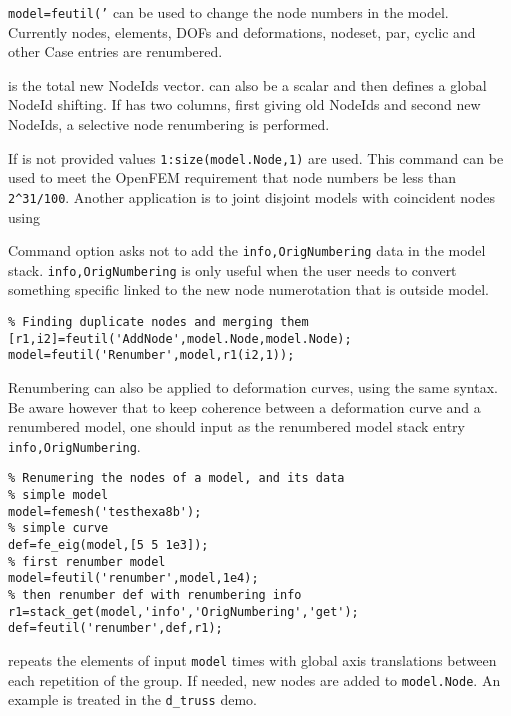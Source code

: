 
{\tt model=feutil('} can be used to change the node numbers in the model. Currently nodes, elements, DOFs and deformations, nodeset, par, cyclic and other Case entries are renumbered.

 is the total new NodeIds vector.  can also be a scalar and then defines a global NodeId shifting. If  has two columns, first giving old NodeIds and second new NodeIds, a selective node renumbering is performed.

If  is not provided values {\tt 1:size(model.Node,1)} are used.  This command can be used to meet the OpenFEM requirement that node numbers be less than {\tt 2\verb+^+31/100}. Another application is to joint disjoint models with coincident nodes using

Command option  asks not to add the {\tt info,OrigNumbering} data in the model stack. {\tt info,OrigNumbering} is only useful when the user needs to convert something specific linked to the new node numerotation that is outside model.

\begin{verbatim}
% Finding duplicate nodes and merging them
[r1,i2]=feutil('AddNode',model.Node,model.Node);
model=feutil('Renumber',model,r1(i2,1));
\end{verbatim}

Renumbering can also be applied to deformation curves, using the same syntax. Be aware however that to keep coherence between a deformation curve and a renumbered model, one should input  as the renumbered model stack entry {\tt info,OrigNumbering}.

\begin{verbatim}
% Renumering the nodes of a model, and its data
% simple model
model=femesh('testhexa8b');
% simple curve
def=fe_eig(model,[5 5 1e3]);
% first renumber model
model=feutil('renumber',model,1e4);
% then renumber def with renumbering info
r1=stack_get(model,'info','OrigNumbering','get');
def=feutil('renumber',def,r1);
\end{verbatim}%


  repeats the elements of input {\tt model}  times with global axis translations  between each repetition of the group. If needed, new nodes are added to {\tt model.Node}. An example is treated in the {\tt d\_truss} demo. 

